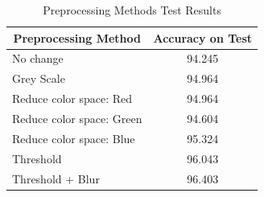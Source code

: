 \documentclass[a4paper,10pt,english]{article}
\begin{document}
    \begin{table}[h!]
        \centering
        \caption{Preprocessing Methods Test Results}
        \label{tab:preprocessing}
        \begin{tabular}{|l|c|}
            \hline
            \multicolumn{1}{|c|}{\textbf{Preprocessing Method}} & \textbf{Accuracy on Test} \\ \hline
            No change                                           & 94.245                    \\ \hline
            Grey Scale                                          & 94.964                    \\ \hline
            Reduce color space: Red                             & 94.964                    \\ \hline
            Reduce color space: Green                           & 94.604                    \\ \hline
            Reduce color space: Blue                            & 95.324                    \\ \hline
            Threshold                                           & 96.043                    \\ \hline
            Threshold + Blur                                    & \cellcolor{green!25}96.403                    \\ \hline
        \end{tabular}
    \end{table}
    
    

    
    
\end{document}
